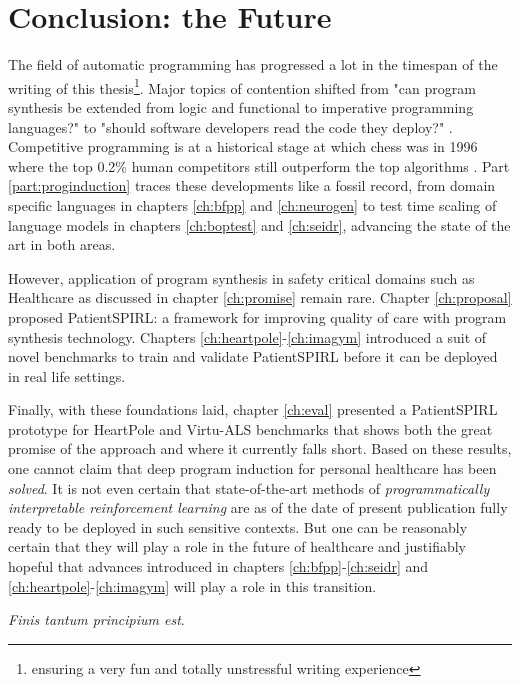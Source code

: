 \chapter{Conclusion: the Future}
\label{ch:conclusion}

The field of automatic programming has progressed a lot in the timespan of the writing of this thesis\footnote{ensuring a very fun and totally unstressful writing experience}.
Major topics of contention shifted from "can program synthesis be extended from logic and functional to imperative programming languages?" \cite{polikarpovaStructuringSynthesisHeapmanipulating2019} to "should software developers read the code they deploy?" \cite{andrejkarpathy[@karpathy]TheresNewKind2025}.
Competitive programming is at a historical stage at which chess was in 1996 \cite{pandolfiniKasparovDeepBlue1997} where the top 0.2\% human competitors still outperform the top algorithms \cite{openaiCompetitiveProgrammingLarge2025}.
Part \ref{part:proginduction} traces these developments like a fossil record, from domain specific languages in chapters \ref{ch:bfpp} and \ref{ch:neurogen} to test time scaling of language models in chapters \ref{ch:boptest} and \ref{ch:seidr}, advancing the state of the art in both areas.

However, application of program synthesis in safety critical domains such as Healthcare as discussed in chapter \ref{ch:promise} remain rare.
Chapter \ref{ch:proposal} proposed PatientSPIRL: a framework for improving quality of care with program synthesis technology.
Chapters \ref{ch:heartpole}-\ref{ch:imagym} introduced a suit of novel benchmarks to train and validate PatientSPIRL before it can be deployed in real life settings.

Finally, with these foundations laid, chapter \ref{ch:eval} presented a PatientSPIRL prototype for HeartPole and Virtu-ALS benchmarks that shows both the great promise of the approach and where it currently falls short.
Based on these results, one cannot claim that deep program induction for personal healthcare has been \emph{solved}.
It is not even certain that state-of-the-art methods of \emph{programmatically interpretable reinforcement learning} are as of the date of present publication fully ready to be deployed in such sensitive contexts.
But one can be reasonably certain that they will play a role in the future of healthcare and justifiably hopeful that advances introduced in chapters \ref{ch:bfpp}-\ref{ch:seidr} and \ref{ch:heartpole}-\ref{ch:imagym} will play a role in this transition.

\emph{Finis tantum principium est}.